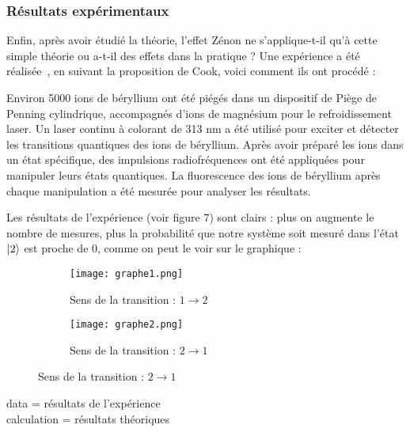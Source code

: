 \documentclass[11pt]{article}
\begin{document}
\newpage

\subsubsection{Résultats expérimentaux}
\qquad Enfin, après avoir étudié la théorie, l'effet Zénon ne s'applique-t-il qu'à cette simple théorie ou a-t-il des effets dans la pratique ? Une expérience a été réalisée~\cite{exp}, en suivant la proposition de Cook, voici comment ils ont procédé :

\qquad Environ 5000 ions de béryllium ont été piégés dans un dispositif de Piège de Penning cylindrique, accompagnés d'ions de magnésium pour le refroidissement laser. Un laser continu à colorant de 313 nm a été utilisé pour exciter et détecter les transitions quantiques des ions de béryllium. Après avoir préparé les ions dans un état spécifique, des impulsions radiofréquences ont été appliquées pour manipuler leurs états quantiques. La fluorescence des ions de béryllium après chaque manipulation a été mesurée pour analyser les résultats.

\qquad Les résultats de l'expérience (voir figure 7) sont clairs : plus on augmente le nombre de mesures, plus la probabilité que notre système soit mesuré dans l'état $\ket{2}$ est proche de 0, comme on peut le voir sur le graphique :


\begin{figure}[h]
    \caption{Graphiques experimentales et théoriques, de la probabilité d'avoir la transition $1 \leftrightarrow 2$ ($p_2$) en fonction du nombre de pulse/mesure}
    \begin{subfigure}{0.5\textwidth}
        \texttt{[image: graphe1.png]}
        \caption{\label{transition12}Sens de la transition : $1 \rightarrow 2$ }
    \end{subfigure}
    \begin{subfigure}{0.5\textwidth}
        \texttt{[image: graphe2.png]}
        \caption{\label{transition21}Sens de la transition : $2 \rightarrow 1$}
    \end{subfigure}
\label{graphe experience}
\end{figure}

\vspace{0.3cm}

data = résultats de l'expérience\\
calculation = résultats théoriques\\

\vspace{0.5cm}
\end{document}
